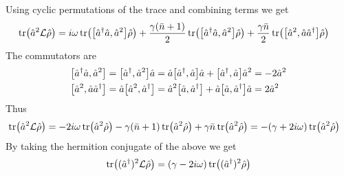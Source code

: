 Using cyclic permutations of the trace and combining terms we get
\begin{align}
    \tr(\a^2 \mathcal{L} \dmatrix) &=  i\omega \tr(\comm{\ad\a}{\a^2}\dmatrix) + \frac{\gamma (\nbar + 1)}{2} \tr(\comm{\ad\a}{\a^2}\dmatrix) + \frac{\gamma \nbar}{2}\tr(\comm{\a^2}{\a\ad}\dmatrix)
\end{align}
The commutators are
\begin{align}
    \comm{\ad\a}{\a^2} &= \comm{\ad}{\a^2}\a = \a\comm{\ad}{\a}\a + \comm{\ad}{\a}\a^2 = -2 \a^2 \\
    \comm{\a^2}{\a\ad} &= \a\comm{\a^2}{\ad} = \a^2 \comm{\a}{\ad}+ \a\comm{\a}{\ad}\a = 2\a^2
\end{align}
Thus
\begin{align}
    \tr(\hat{a}^2 \mathcal{L} \hat{\rho}) &=  -2i\omega \tr(\hat{a}^2 \hat{\rho}) - \gamma(\bar{n} + 1) \tr(\hat{a}^2 \hat{\rho}) + \gamma \bar{n} \tr(\hat{a}^2 \hat{\rho}) = -(\gamma + 2i\omega) \tr(\hat{a}^2 \hat{\rho})
\end{align}
By taking the hermition conjugate of the above we get
\begin{equation}
    \tr((\hat{a}^{\dagger})^2 \mathcal{L} \hat{\rho}) = (\gamma - 2i\omega) \tr((\hat{a}^{\dagger})^2 \hat{\rho})
\end{equation}
